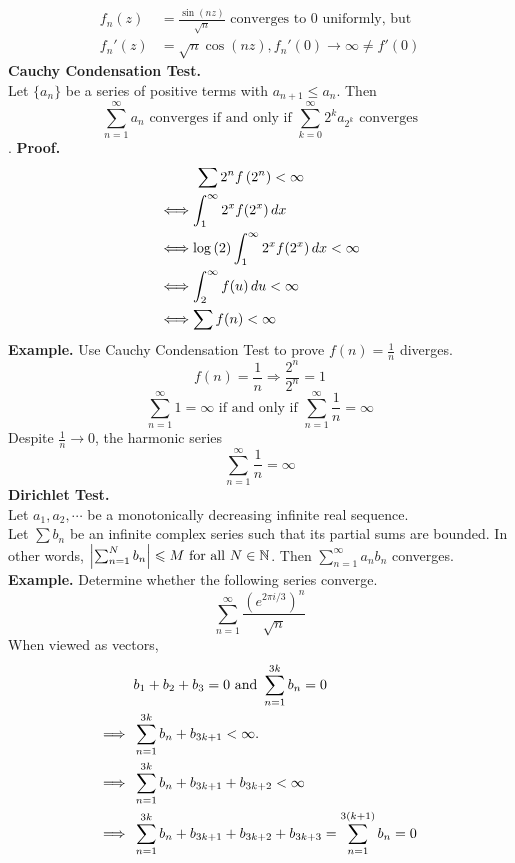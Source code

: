 \documentclass[11pt]{article}
\DeclarePairedDelimiter\abs{\lvert}{\rvert}
\begin{document}
\begin{align*}
f_n(z) &= \frac{\sin(nz)}{\sqrt{n}} \text{ converges to 0 uniformly, but } \\ 
f_n'(z) &= \sqrt{n}\cos(nz), f_n'(0) \to \infty \neq f'(0)
\end{align*}
\textbf{Cauchy Condensation Test.} \\
Let $\{a_n\}$ be a series of positive terms with $a_{n + 1} \leqslant a_n$. Then 
$$\sum_{n = 1}^{\infty} a_n \text{ converges if and only if } \sum_{k = 0}^{\infty} 2^ka_{2^k} \text{ converges} $$. 
\textbf{Proof.} 
\begin{align*}
&\hspace{9mm} \sum {2^nf\left(2^n\right)} < \infty \\
&\Longleftrightarrow \int_{1}^{\infty}2^x f(2^x)\,dx \\ 
&\Longleftrightarrow \log{(2)}\int_1^{\infty}2^x f(2^x) \,dx < \infty \\
&\Longleftrightarrow \int_2^{\infty} f(u) \, du < \infty \\
&\Longleftrightarrow \sum f(n) < \infty
\end{align*}
\textbf{Example.} Use Cauchy Condensation Test to prove $f(n) = \frac{1}{n}$ diverges. \\
$$f(n) = \frac{1}{n} \Rightarrow \frac{2^n}{2^n} = 1$$
\begin{equation*}
\sum_{n = 1}^{\infty} 1 = \infty \mbox{ if and only if } \sum_{n = 1}^{\infty} \frac{1}{n} = \infty
\end{equation*}
Despite $\frac{1}{n} \to 0$, the harmonic series 
$$ \sum_{n = 1}^{\infty} \frac{1}{n} = \infty$$ 
\newline
\textbf{Dirichlet Test.} \\
Let $a_1, a_2, \cdots$ be a monotonically decreasing infinite real sequence. \\
Let $\sum {b_n}$ be an infinite complex series such that its partial sums are bounded. In other words, 
$\abs*{\sum_{n = 1}^N {b_n}} \leqslant M \text{ for all } N \in \mathbb{N}$.
Then $\sum_{n = 1}^{\infty} a_nb_n$ converges. \\
\newline
\textbf{Example.} Determine whether the following series converge. 
$$\sum_{n = 1}^{\infty} \frac{\left(e^{2\pi i /3}\right)^n}{\sqrt{n}}$$
When viewed as vectors, 
\begin{align*}
&b_1 + b_2 + b_3 = 0 \text{ and } \sum_{n = 1}^{3k} b_n = 0 \\ 
\Longrightarrow \hspace{2mm}&\sum_{n = 1}^{3k}b_n + b_{3k + 1} < \infty. \\
\Longrightarrow \hspace{2mm}&\sum_{n = 1}^{3k}b_n + b_{3k + 1} + b_{3k + 2} < \infty \\ 
\Longrightarrow \hspace{2mm}&\sum_{n = 1}^{3k}b_n + b_{3k + 1} + b_{3k + 2} + b_{3k + 3} = \sum_{n = 1}^{3(k + 1)}b_n = 0
\end{align*}
\end{document}
